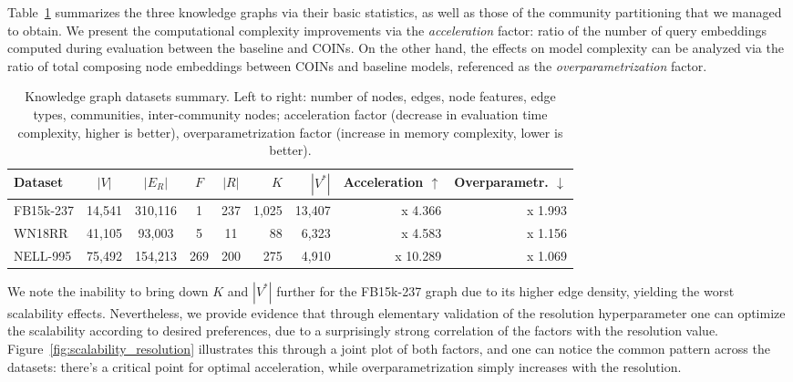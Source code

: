 Table~\ref{tab:datasets} summarizes the three knowledge graphs via their basic statistics, as well as those of the community partitioning that we managed to obtain. We present the computational complexity improvements via the \emph{acceleration} factor: ratio of the number of query embeddings computed during evaluation between the baseline and COINs. On the other hand, the effects on model complexity can be analyzed via the ratio of total composing node embeddings between COINs and baseline models, referenced as the \emph{overparametrization} factor. 

\begin{table}[H]
  \caption[Knowledge graph datasets summary.]{Knowledge graph datasets summary. Left to right: number of nodes, edges, node features, edge types, communities, inter-community nodes; acceleration factor (decrease in evaluation time complexity, higher is better), overparametrization factor (increase in memory complexity, lower is better).}
  \label{tab:datasets}
  \centering
  \begin{adjustbox}{width=\textwidth}
  \begin{tabular}{lccccrrrr}
    \toprule
    Dataset & $|V|$ & $|E_R|$ & $F$ & $|R|$ & $K$ & $|V^*|$ & Acceleration $\uparrow$ & Overparametr. $\downarrow$ \\ %
    \midrule
    FB15k-237 & 14,541 & 310,116 & 1 & 237 & 1,025 & 13,407 & x 4.366 & x 1.993 \\
    WN18RR & 41,105 & 93,003 & 5 & 11 & 88 & 6,323 & x 4.583 & x 1.156 \\
    NELL-995 & 75,492 & 154,213 & 269 & 200 & 275 & 4,910 & x 10.289 & x 1.069 \\
    \bottomrule
  \end{tabular}
  \end{adjustbox}
\end{table}

We note the inability to bring down $K$ and $|V^*|$ further for the FB15k-237 graph due to its higher edge density, yielding the worst scalability effects. Nevertheless, we provide evidence that through elementary validation of the resolution hyperparameter one can optimize the scalability according to desired preferences, due to a surprisingly strong correlation of the factors with the resolution value. Figure~\ref{fig:scalability_resolution} illustrates this through a joint plot of both factors, and one can notice the common pattern across the datasets: there's a critical point for optimal acceleration, while overparametrization simply increases with the resolution.

